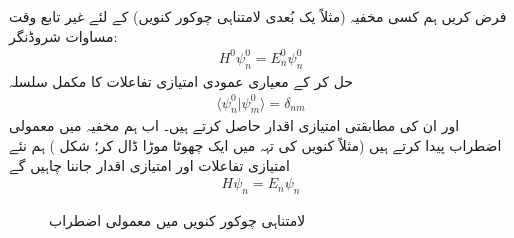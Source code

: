 
فرض کریں ہم کسی مخفیہ (مثلاً یک بُعدی لامتناہی چوکور کنویں) کے لئے غیر تابع وقت مساوات شروڈنگر:
\begin{align}\label{مساوات_اضطراب_پہلی}
H^0\psi_n^0=E_n^0\psi_n^0
\end{align}
حل کر کے معیاری عمودی امتیازی تفاعلات  کا مکمل سلسلہ
\begin{align}
\langle \psi_n^0 | \psi_m^0 \rangle = \delta_{nm}
\end{align}
اور ان کی مطابقتی امتیازی اقدار  حاصل کرتے ہیں۔ اب ہم مخفیہ میں معمولی اضطراب پیدا کرتے ہیں (مثلاً کنویں کی تہہ میں ایک چھوٹا موڑا ڈال کر؛ شکل ) ہم نئے امتیازی تفاعلات اور امتیازی اقدار جاننا چاہیں گے
\begin{align}\label{مساوات_اضطراب_بنیادی}
H\psi_n = E_n\psi_n
\end{align}
%
\begin{figure}
\centering
{}
\caption{لامتناہی چوکور کنویں میں معمولی اضطراب}
\label{شکل_غیر_تابع_اضطراب_چکور_معمولی}
\end{figure}


